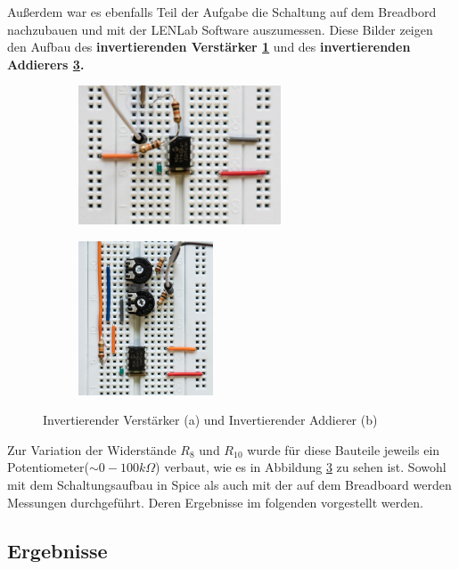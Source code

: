 \newpage
Außerdem war es ebenfalls Teil der Aufgabe die Schaltung auf dem Breadbord nachzubauen und mit der LENLab Software auszumessen. Diese Bilder zeigen den Aufbau des \textbf{invertierenden Verstärker \ref{invV}} und des \textbf{invertierenden Addierers \ref{invA}.}

\begin{figure}[h]
\centering
\begin{subfigure}{.5\textwidth}
  \centering
  \includegraphics[width=6cm]{pics/Invertierer_aufgebaut.jpg}
  \label{invV}
\end{subfigure}%
\begin{subfigure}{.5\textwidth}
  \centering
  \includegraphics[width=4cm]{pics/Addierer_aufgebaut.jpg}
  \label{invA}
\end{subfigure}
\caption{Invertierender Verstärker (a) und Invertierender Addierer (b)}
\end{figure}

Zur Variation der Widerstände $R_{8}$ und $R_{10}$ wurde für diese Bauteile jeweils ein \newline Potentiometer($\sim 0-100k\Omega$) verbaut, wie es in Abbildung \ref{invA} zu sehen ist.
\newline Sowohl mit dem Schaltungsaufbau in Spice als auch mit der auf dem Breadboard werden Messungen durchgeführt. Deren Ergebnisse im folgenden vorgestellt werden.

\subsection{Ergebnisse}
